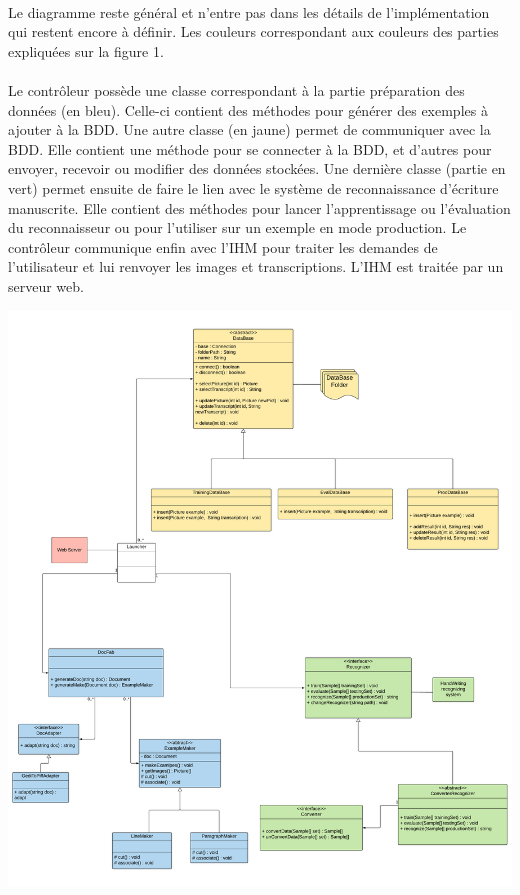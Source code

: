 \paragraph{}
Le diagramme reste général et n’entre pas dans les détails de l’implémentation
qui restent encore à définir. Les couleurs correspondant aux couleurs des
parties expliquées sur la figure 1.

\paragraph{}
Le contrôleur possède une classe correspondant à la partie préparation des
données (en bleu). Celle-ci contient des méthodes pour générer des exemples
à ajouter à la BDD. Une autre classe (en jaune) permet de communiquer avec
la BDD. Elle contient une méthode pour se connecter à la BDD, et d’autres pour
envoyer, recevoir ou modifier des données stockées. Une dernière classe
(partie en vert) permet ensuite de faire le lien avec le système de
reconnaissance d’écriture manuscrite. Elle contient des méthodes pour lancer
l’apprentissage ou l’évaluation du reconnaisseur ou pour l’utiliser sur un
exemple en mode production. Le contrôleur communique enfin avec l’IHM pour
traiter les demandes de l’utilisateur et lui renvoyer les images et
transcriptions. L’IHM est traitée par un serveur web.


\begin{mdframed}[frametitle={Figure 16 : Diagramme de classes du contrôleur}, innerbottommargin=10]
\begin{center}
\includegraphics[scale=0.25]{Specifications.pdf}
\end{center}
\end{mdframed}
